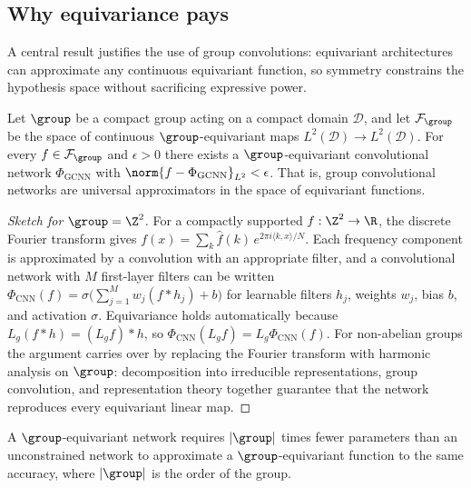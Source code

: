 \subsection{Why equivariance pays}
\label{sec:groups:why-pays}

A central result justifies the use of group convolutions: equivariant
architectures can approximate any continuous equivariant function, so symmetry
constrains the hypothesis space without sacrificing expressive power.

\begin{theorem}
\label{thm:groups:universality}
Let $\group$ be a compact group acting on a compact domain $\mathcal{D}$, and let
$\mathcal{F}_{\group}$ be the space of continuous $\group$-equivariant maps
$L^2(\mathcal{D}) \to L^2(\mathcal{D})$. For every $f \in \mathcal{F}_{\group}$
and $\epsilon > 0$ there exists a $\group$-equivariant convolutional network
$\Phi_{\text{GCNN}}$ with $\norm{f - \Phi_{\text{GCNN}}}_{L^2} < \epsilon$. That
is, group convolutional networks are universal approximators in the space of
equivariant functions.
\end{theorem}

\begin{proof}[Sketch for $\group = \Z^2$]
For a compactly supported $f: \Z^2 \to \R$, the discrete Fourier transform gives
$f(x) = \sum_{k} \hat f(k)\, e^{2\pi i \langle k, x\rangle / N}$. Each frequency
component is approximated by a convolution with an appropriate filter, and a
convolutional network with $M$ first-layer filters can be written
$\Phi_{\text{CNN}}(f) = \sigma\big(\sum_{j=1}^M w_j (f * h_j) + b\big)$ for
learnable filters $h_j$, weights $w_j$, bias $b$, and activation $\sigma$.
Equivariance holds automatically because $L_g(f * h) = (L_g f) * h$, so
$\Phi_{\text{CNN}}(L_g f) = L_g \Phi_{\text{CNN}}(f)$. For non-abelian groups the
argument carries over by replacing the Fourier transform with harmonic analysis
on $\group$: decomposition into irreducible representations, group convolution,
and representation theory together guarantee that the network reproduces every
equivariant linear map.
\end{proof}

\begin{corollary}
\label{cor:groups:parameter-efficiency}
A $\group$-equivariant network requires $|\group|$ times fewer parameters than an
unconstrained network to approximate a $\group$-equivariant function to the same
accuracy, where $|\group|$ is the order of the group.
\end{corollary}

